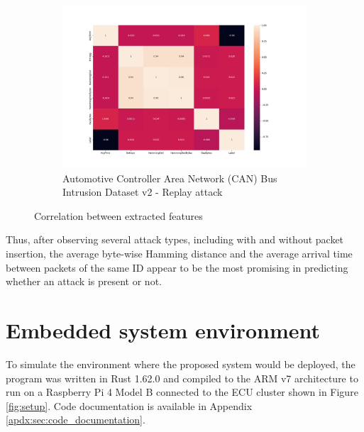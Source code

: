 \begin{figure}
    \begin{subfigure}[b]{.6\linewidth}
        \centering
        \includegraphics[width = \linewidth]{img/parts/app/feature_correlation/OpelAstra/replay.png}
        \caption{Automotive Controller Area Network (CAN) Bus Intrusion Dataset v2 - Replay attack}
        \label{subfig:fe_tue_opelastra}
    \end{subfigure}
    
    \caption{Correlation between extracted features}
    \label{fig:fe}
\end{figure}

Thus, after observing several attack types, including with and without packet insertion, the average byte-wise Hamming distance and the average arrival time between packets of the same ID appear to be the most promising in predicting whether an attack is present or not.

\section{Embedded system environment}
\label{sec:app_embedded}

To simulate the environment where the proposed system would be deployed, the program was written in Rust 1.62.0 and compiled to the ARM v7 architecture to run on a Raspberry Pi 4 Model B connected to the ECU cluster shown in Figure \ref{fig:setup}. Code documentation is available in Appendix \ref{apdx:sec:code_documentation}.\par

